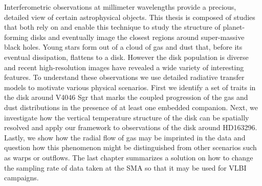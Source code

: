 
Interferometric observations at millimeter wavelengths provide a precious, detailed view 
of certain astrophysical objects.  This thesis is composed of studies that both rely on and enable this 
technique to study the structure of planet-forming disks and eventually image the closest regions around 
super-massive black holes.  Young stars form out of a cloud of gas and dust that, before its eventual dissipation,
flattens to a disk.  However the disk population is diverse and recent high-resolution images have 
revealed a wide variety of interesting features.  To understand these observations we use detailed radiative 
transfer models to motivate various physical scenarios.  First we identify a set of traits in the disk around
V4046 Sgr that marks the coupled progression of the gas and dust distributions in the presence of at least one
embedded companion.  Next, we investigate how the vertical temperature structure of the disk can be spatially 
resolved and apply our framework to observations of the disk around HD163296.  Lastly, we show how the radial 
flow of gas may be imprinted in the data and question how this phenomenon might be distinguished from other 
scenarios such as warps or outflows.  The last chapter summarizes a solution on how to change the sampling 
rate of data taken at the SMA so that it may be used for VLBI campaigns.
